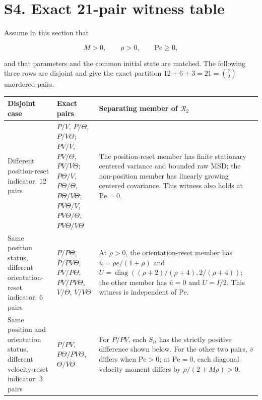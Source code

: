 \section{S4. Exact 21-pair witness table}\label{s4.-exact-21-pair-witness-table}

Assume in this section that

\[
M>0,\qquad \rho>0,\qquad \mathrm{Pe}\ge0,
\]

and that parameters and the common initial state are matched. The following three rows are disjoint and give the exact partition \(12 + 6 + 3 = 21=\binom72\) unordered pairs.

{\def\LTcaptype{none} %
\begin{longtable}[]{@{}
  >{\raggedright\arraybackslash}p{}
  >{\raggedright\arraybackslash}p{}
  >{\raggedright\arraybackslash}p{}@{}}
\toprule\noalign{}
\begin{minipage}[b]{\linewidth}\raggedright
Disjoint case
\end{minipage} & \begin{minipage}[b]{\linewidth}\raggedright
Exact pairs
\end{minipage} & \begin{minipage}[b]{\linewidth}\raggedright
Separating member of \(\mathcal R_2\)
\end{minipage} \\
\midrule\noalign{}
\endhead
\bottomrule\noalign{}
\endlastfoot
Different position-reset indicator: \(12\) pairs & \(P/V\), \(P/\Theta\), \(P/V\Theta\); \(PV/V\), \(PV/\Theta\), \(PV/V\Theta\); \(P\Theta/V\), \(P\Theta/\Theta\), \(P\Theta/V\Theta\); \(PV\Theta/V\), \(PV\Theta/\Theta\), \(PV\Theta/V\Theta\) & The position-reset member has finite stationary centered variance and bounded raw MSD; the non-position member has linearly growing centered covariance. This witness also holds at \(\mathrm{Pe}=0\). \\
Same position status, different orientation-reset indicator: \(6\) pairs & \(P/P\Theta\), \(P/PV\Theta\), \(PV/P\Theta\), \(PV/PV\Theta\), \(V/\Theta\), \(V/V\Theta\) & At \(\rho>0\), the orientation-reset member has \(\bar u=\rho e/(1+\rho)\) and \(U=\operatorname{diag}((\rho+2)/(\rho+4),2/(\rho+4))\); the other member has \(\bar u=0\) and \(U=I/2\). This witness is independent of \(\mathrm{Pe}\). \\
Same position and orientation status, different velocity-reset indicator: \(3\) pairs & \(P/PV\), \(P\Theta/PV\Theta\), \(\Theta/V\Theta\) & For \(P/PV\), each \(S_{ii}\) has the strictly positive difference shown below. For the other two pairs, \(\bar v\) differs when \(\mathrm{Pe}>0\); at \(\mathrm{Pe}=0\), each diagonal velocity moment differs by \(\rho/(2+M\rho)>0\). \\
\end{longtable}
}

